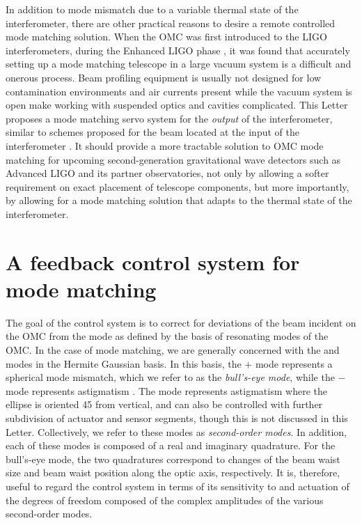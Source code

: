 In addition to mode mismatch due to a variable thermal state of the interferometer, there are other practical reasons to desire a remote controlled mode matching solution. %
When the OMC was first introduced to the LIGO interferometers, during the Enhanced LIGO phase \cite{Tobin}, it was found that accurately setting up a mode matching telescope in a large vacuum system is a difficult and onerous process. %
Beam profiling equipment is usually not designed for low contamination environments and air currents present while the vacuum system is open make working with suspended optics and cavities complicated. %
This Letter proposes a mode matching servo system for the {\it output} of the interferometer, similar to schemes proposed for the beam located at the input of the interferometer \cite{Arain:10,Mueller:00}. %
It should provide a more tractable solution to OMC mode matching for upcoming second-generation gravitational wave detectors such as Advanced LIGO and its partner observatories, not only by allowing a softer requirement on exact placement of telescope components, but more importantly, by allowing for a mode matching solution that adapts to the thermal state of the interferometer.

\section{A feedback control system for mode matching}
The goal of the control system is to correct for deviations of the beam incident on the OMC from the  mode as defined by the basis of resonating modes of the OMC. %
In the case of mode matching, we are generally concerned with the  and  modes in the Hermite Gaussian basis. %
In this basis, the  $+$  mode represents a spherical mode mismatch, which we refer to as the \emph{bull's-eye mode}, while the  $-$  mode represents astigmatism \cite{Hefetz:97}. %
The  mode represents astigmatism where the ellipse is oriented 45\degrees{} from vertical, and can also be controlled with further subdivision of actuator and sensor segments, though this is not discussed in this Letter. %
Collectively, we refer to these modes as \emph{second-order modes}. %
In addition, each of these modes is composed of a real and imaginary quadrature. %
For the bull's-eye mode, the two quadratures correspond to changes of the beam waist size and beam waist position along the optic axis, respectively. %
It is, therefore, useful to regard the control system in terms of its sensitivity to and actuation of the degrees of freedom composed of the complex amplitudes of the various second-order modes.

